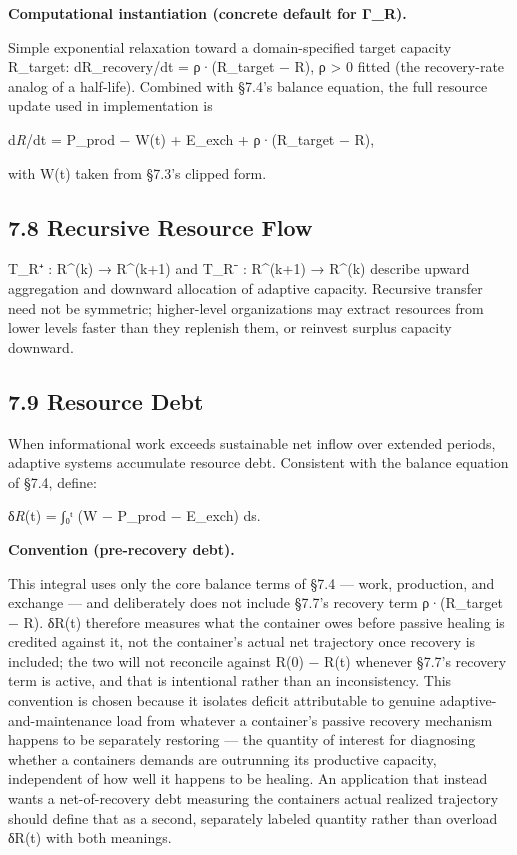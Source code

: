 \documentclass[
]{article}
\begin{document}
\textbf{Computational instantiation (concrete default for Γ\_R).}

Simple exponential relaxation toward a domain-specified target capacity
R\_target: dR\_recovery/dt = ρ·(R\_target − R), ρ \textgreater{} 0
fitted (the recovery-rate analog of a half-life). Combined with §7.4's
balance equation, the full resource update used in implementation is

d\emph{R}/dt = P\_prod − W(t) + E\_exch + ρ·(R\_target − R),

with W(t) taken from §7.3's clipped form.

\hypertarget{recursive-resource-flow}{%
\subsection{7.8 Recursive Resource Flow}\label{recursive-resource-flow}}

T\_R⁺ : R\^{}(k) → R\^{}(k+1) and T\_R⁻ : R\^{}(k+1) → R\^{}(k) describe
upward aggregation and downward allocation of adaptive capacity.
Recursive transfer need not be symmetric; higher-level organizations may
extract resources from lower levels faster than they replenish them, or
reinvest surplus capacity downward.

\hypertarget{resource-debt}{%
\subsection{7.9 Resource Debt}\label{resource-debt}}

When informational work exceeds sustainable net inflow over extended
periods, adaptive systems accumulate resource debt. Consistent with the
balance equation of §7.4, define:

δ\emph{R}(t) = ∫₀ᵗ (W − P\_prod − E\_exch) ds.

\textbf{Convention (pre-recovery debt).}

This integral uses only the core balance terms of §7.4 --- work,
production, and exchange --- and deliberately does not include §7.7's
recovery term ρ·(R\_target − R). δR(t) therefore measures what the
container owes before passive healing is credited against it, not the
container's actual net trajectory once recovery is included; the two
will not reconcile against R(0) − R(t) whenever §7.7's recovery term is
active, and that is intentional rather than an inconsistency. This
convention is chosen because it isolates deficit attributable to genuine
adaptive-and-maintenance load from whatever a container's passive
recovery mechanism happens to be separately restoring --- the quantity
of interest for diagnosing whether a container\textquotesingle s demands
are outrunning its productive capacity, independent of how well it
happens to be healing. An application that instead wants a
net-of-recovery debt measuring the container\textquotesingle s actual
realized trajectory should define that as a second, separately labeled
quantity rather than overload δR(t) with both meanings.
\end{document}
